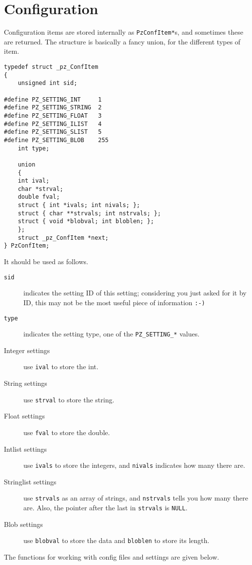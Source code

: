 \documentclass[12pt,letterpaper]{report}
\let\ttt\tt
\def\tt{\def\_{{\ttt\char`\_}}\ttt}
\begin{document}
\section{Configuration}
Configuration items are stored internally as \verb|PzConfItem*|s, and sometimes these
are returned. The structure is basically a fancy union, for the different types of item.

\begin{verbatim}
typedef struct _pz_ConfItem 
{
    unsigned int sid;

#define PZ_SETTING_INT     1
#define PZ_SETTING_STRING  2
#define PZ_SETTING_FLOAT   3
#define PZ_SETTING_ILIST   4
#define PZ_SETTING_SLIST   5
#define PZ_SETTING_BLOB    255
    int type;

    union 
    {
	int ival;
	char *strval;
	double fval;
	struct { int *ivals; int nivals; };
	struct { char **strvals; int nstrvals; };
	struct { void *blobval; int bloblen; };
    };
    struct _pz_ConfItem *next;
} PzConfItem;
\end{verbatim}
It should be used as follows.
\begin{description}
\item[{\tt sid}] indicates the setting ID of this setting; considering you just asked for it
by ID, this may not be the most useful piece of information {\tt :-)}
\item[{\tt type}] indicates the setting type, one of the \verb|PZ_SETTING_*| values.
\item[Integer settings] use \verb|ival| to store the int.
\item[String settings] use \verb|strval| to store the string.
\item[Float settings] use \verb|fval| to store the double.
\item[Intlist settings] use \verb|ivals| to store the integers, and \verb|nivals| indicates how
many there are.
\item[Stringlist settings] use \verb|strvals| as an array of strings, and \verb|nstrvals| tells you
how many there are. Also, the pointer after the last in \verb|strvals| is \verb|NULL|.
\item[Blob settings] use \verb|blobval| to store the data and \verb|bloblen| to store its length.
\end{description}

The functions for working with config files and settings are given below.
\end{document}

